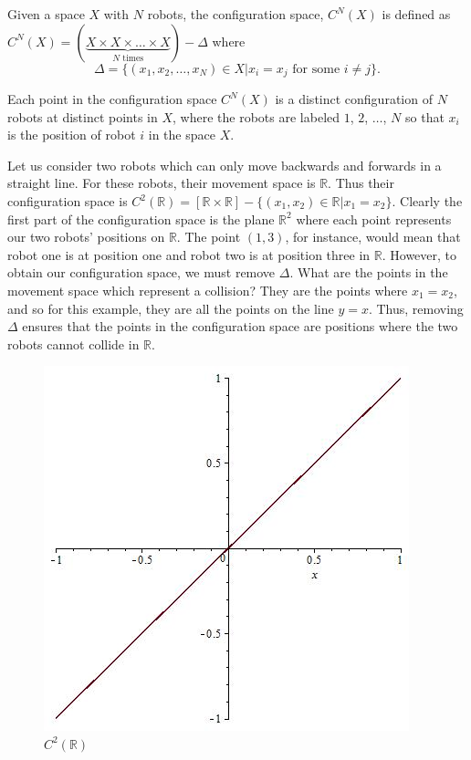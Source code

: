 \documentclass{amsart}
\newenvironment{defn}[1][Definition]{\begin{trivlist}
\item[\hskip \labelsep {\bfseries #1}]}{\end{trivlist}}
\newcommand{\R}{\mathbb{R}}
\begin{document}
\begin{defn}
Given a space $X$ with $N$ robots, the configuration space, $C^N(X)$ is defined as $C^N(X)= (\underbrace{X \times X\times \dots \times X}_{N \text{ times} }) - \Delta$ where $$\Delta = \{(x_1, x_2, \dots, x_N) \in X | x_i =x_j \text{ for some } i \neq j\}.$$ 
\end{defn}

Each point in the configuration space $C^N(X)$ is a distinct configuration of $N$ robots at distinct points in $X$, where the robots are labeled $1$, $2$, $\ldots$, $N$ so that $x_i$ is the position of robot $i$ in the space $X$. 

Let us consider two robots which can only move backwards and forwards in a straight line. For these robots, their movement space is $\R$. Thus their configuration space is $C^2(\R) = [\R\times \R]- \{(x_1,x_2)\in \R | x_1 = x_2\}$. Clearly the first part of the configuration space is the plane $\R^2$ where each point represents our two robots' positions on $\R$. The point $(1,3)$, for instance, would mean that robot one is at position one and robot two is at position three in $\R$. However, to obtain our configuration space, we must remove $\Delta$. What are the points in the movement space which represent a collision? They are the points where $x_1=x_2$, and so for this example, they are all the points on the line $y=x$. Thus, removing $\Delta$ ensures that the points in the configuration space are positions where the two robots cannot collide in $\R$.

\begin{figure}[h]\label{fig:xygraph}
\centering
\caption{$C^2(\R)$}
\includegraphics[scale=.25]{Presentation/xygraph.jpg}
\end{figure}
\end{document}
